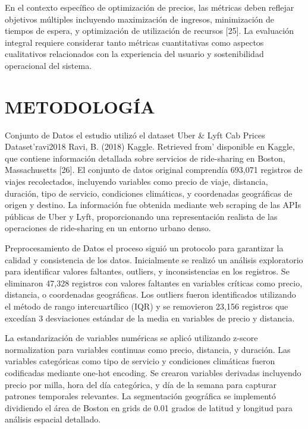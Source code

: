 \documentclass[conference]{IEEEtran}
\begin{document}
En el contexto específico de optimización de precios, las métricas deben reflejar objetivos múltiples incluyendo maximización de ingresos, minimización de tiempos de espera, y optimización de utilización de recursos [25]. La evaluación integral requiere considerar tanto métricas cuantitativas como aspectos cualitativos relacionados con la experiencia del usuario y sostenibilidad operacional del sistema.

\section{METODOLOGÍA}

Conjunto de Datos el estudio utilizó el dataset Uber \& Lyft Cab Prices Dataset'{ravi2018} Ravi, B. (2018) Kaggle. Retrieved from' disponible en Kaggle, que contiene información detallada sobre servicios de ride-sharing en Boston, Massachusetts [26]. El conjunto de datos original comprendía 693,071 registros de viajes recolectados, incluyendo variables como precio de viaje, distancia, duración, tipo de servicio, condiciones climáticas, y coordenadas geográficas de origen y destino. La información fue obtenida mediante web scraping de las APIs públicas de Uber y Lyft, proporcionando una representación realista de las operaciones de ride-sharing en un entorno urbano denso.

Preprocesamiento de Datos el proceso siguió un protocolo para garantizar la calidad y consistencia de los datos. Inicialmente se realizó un análisis exploratorio para identificar valores faltantes, outliers, y inconsistencias en los registros. Se eliminaron 47,328 registros con valores faltantes en variables críticas como precio, distancia, o coordenadas geográficas. Los outliers fueron identificados utilizando el método de rango intercuartílico (IQR) y se removieron 23,156 registros que excedían 3 desviaciones estándar de la media en variables de precio y distancia.

La estandarización de variables numéricas se aplicó utilizando z-score normalization para variables continuas como precio, distancia, y duración. Las variables categóricas como tipo de servicio y condiciones climáticas fueron codificadas mediante one-hot encoding. Se crearon variables derivadas incluyendo precio por milla, hora del día categórica, y día de la semana para capturar patrones temporales relevantes. La segmentación geográfica se implementó dividiendo el área de Boston en grids de 0.01 grados de latitud y longitud para análisis espacial detallado.
\end{document}
